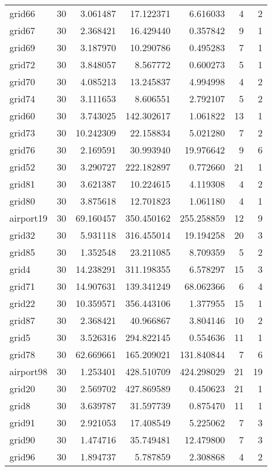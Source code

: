 \begin{longtable}{|l|r|r|r|r|r|r|}
grid66 & 30 & 3.061487 & 17.122371 & 6.616033 & 4 & 2 \\
grid67 & 30 & 2.368421 & 16.429440 & 0.357842 & 9 & 1 \\
grid69 & 30 & 3.187970 & 10.290786 & 0.495283 & 7 & 1 \\
grid72 & 30 & 3.848057 & 8.567772 & 0.600273 & 5 & 1 \\
grid70 & 30 & 4.085213 & 13.245837 & 4.994998 & 4 & 2 \\
grid74 & 30 & 3.111653 & 8.606551 & 2.792107 & 5 & 2 \\
grid60 & 30 & 3.743025 & 142.302617 & 1.061822 & 13 & 1 \\
grid73 & 30 & 10.242309 & 22.158834 & 5.021280 & 7 & 2 \\
grid76 & 30 & 2.169591 & 30.993940 & 19.976642 & 9 & 6 \\
grid52 & 30 & 3.290727 & 222.182897 & 0.772660 & 21 & 1 \\
grid81 & 30 & 3.621387 & 10.224615 & 4.119308 & 4 & 2 \\
grid80 & 30 & 3.875618 & 12.701823 & 1.061180 & 4 & 1 \\
airport19 & 30 & 69.160457 & 350.450162 & 255.258859 & 12 & 9 \\
grid32 & 30 & 5.931118 & 316.455014 & 19.194258 & 20 & 3 \\
grid85 & 30 & 1.352548 & 23.211085 & 8.709359 & 5 & 2 \\
grid4 & 30 & 14.238291 & 311.198355 & 6.578297 & 15 & 3 \\
grid71 & 30 & 14.907631 & 139.341249 & 68.062366 & 6 & 4 \\
grid22 & 30 & 10.359571 & 356.443106 & 1.377955 & 15 & 1 \\
grid87 & 30 & 2.368421 & 40.966867 & 3.804146 & 10 & 2 \\
grid5 & 30 & 3.526316 & 294.822145 & 0.554636 & 11 & 1 \\
grid78 & 30 & 62.669661 & 165.209021 & 131.840844 & 7 & 6 \\
airport98 & 30 & 1.253401 & 428.510709 & 424.298029 & 21 & 19 \\
grid20 & 30 & 2.569702 & 427.869589 & 0.450623 & 21 & 1 \\
grid8 & 30 & 3.639787 & 31.597739 & 0.875470 & 11 & 1 \\
grid91 & 30 & 2.921053 & 17.408549 & 5.225062 & 7 & 3 \\
grid90 & 30 & 1.474716 & 35.749481 & 12.479800 & 7 & 3 \\
grid96 & 30 & 1.894737 & 5.787859 & 2.308868 & 4 & 2 \\

\end{longtable}
